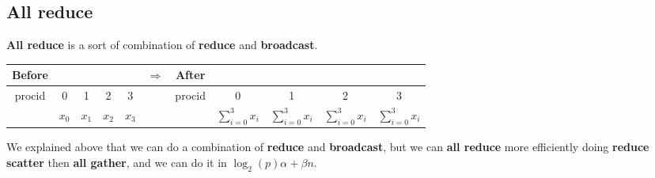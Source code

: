 \documentclass[12pt, openany]{report}
\theoremstyle{definition}
\begin{document}
\subsection{All reduce}
\textbf{All reduce} is a sort of combination of \textbf{reduce} and \textbf{broadcast}.\\
\begin{center}
	\begin{tabular}{ccccc|c|ccccc}
		Before &&&&& $\Longrightarrow$ &After&&&&\\
		\hline
		procid & 0 & 1 & 2 & 3 & & procid & 0 & 1 & 2 & 3\\
		\hline
		& $x_0$ & $x_1$ & $x_2$ & $x_3$ && & $\displaystyle \sum_{i=0}^{3} x_i$ & $\displaystyle \sum_{i=0}^{3} x_i$ & $\displaystyle \sum_{i=0}^{3} x_i$ & $\displaystyle \sum_{i=0}^{3} x_i$\\
		\hline
	\end{tabular}
\end{center}
We explained above that we can do a combination of \textbf{reduce} and \textbf{broadcast}, but we can \textbf{all reduce} more efficiently doing \textbf{reduce scatter} then \textbf{all gather}, and we can do it in $\log_2(p)\alpha + \beta n$.
\end{document}
